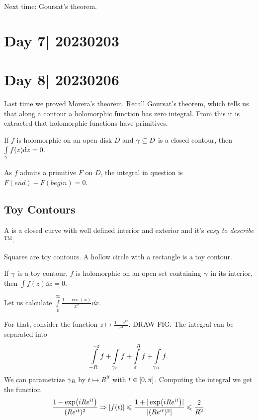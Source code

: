 \documentclass[12pt]{memoir}
\begin{document}
Next time: Goursat's theorem.

\section{Day 7| 20230203}

\section{Day 8| 20230206}

Last time we proved Morera's theorem. Recall Goursat's theorem, which tells us that along a contour a holomorphic function has zero integral. From this it is extracted that holomorphic functions have primitives.

\begin{Cor}
    If $f$ is holomorphic on an open disk $D$ and $\gamma\subseteq D$ is a closed contour, then $\int\limits_\gamma f(z)\dd z=0$.
\end{Cor}

\begin{ptcbp}
    As $f$ admits a primitive $F$ on $D$, the integral in question is $F(end)-F(begin)=0$.
\end{ptcbp}

\subsection{Toy Contours}

A  is a closed curve with well defined interior and exterior and it's \emph{easy to describe${}^{\text{TM}}$}.

\begin{Ex}
    Squares are toy contours. A hollow circle with a rectangle is a toy contour.
\end{Ex}

\begin{Th}
    If $\gamma$ is a toy contour, $f$
 is holomorphic on an open set containing $\gamma$ in its interior, then $\int f(z)\dd z=0$.
\end{Th}

\begin{Ex}
    Let us calculate $\int\limits_0^\infty\frac{1-\cos(x)}{x^2}\dd x$.\par 
    For that, consider the function $z\mapsto \frac{1-e^{iz}}{z^2}$. DRAW FIG. The integral can be separated into 
    $$\int\limits_{-R}^{-\varepsilon}f+\int\limits_{\gamma_\varepsilon}^{}f+\int\limits_{\varepsilon}^{R}f+\int\limits_{\gamma_R}f.$$
    We can parametrize $\gamma_R$ by $t\mapsto R^{it}$ with $t\in\left\lbrack0,\pi\right\rbrack$. Computing the integral we get the function 
    $$\frac{1-\exp(iRe^{it})}{(Re^{it})^2}\Rightarrow |f(t)|\leqslant \frac{1+|\exp(iRe^{it})|}{|(Re^{it})^2|}\leqslant\frac{2}{R^2}.$$
\end{Ex}
\end{document}
